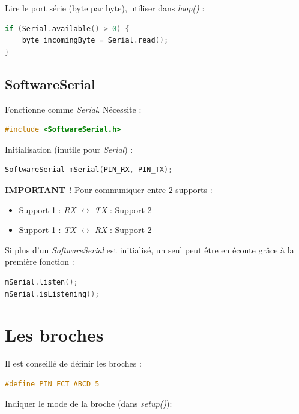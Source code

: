             \bmar
                Lire le port série (byte par byte), utiliser dans \textit{loop()} :
            \emar
            \begin{lstlisting}[language=C]
if (Serial.available() > 0) {
    byte incomingByte = Serial.read();
}
            \end{lstlisting}
        \subsection{SoftwareSerial}
            \bmar
                Fonctionne comme \textit{Serial}. Nécessite :
            \emar
            \begin{lstlisting}[language=C]
#include <SoftwareSerial.h>
            \end{lstlisting}
            \bmar
                Initialisation (inutile pour \textit{Serial}) :
            \emar
            \begin{lstlisting}[language=C]
SoftwareSerial mSerial(PIN_RX, PIN_TX);
            \end{lstlisting}
            \bmar
                \textbf{IMPORTANT !} Pour communiquer entre 2 supports :
            \emar
            \begin{itemize}
                \item Support 1 : \textit{RX} $\leftrightarrow$ \textit{TX} : Support 2
                \item Support 1 : \textit{TX} $\leftrightarrow$ \textit{RX} : Support 2
            \end{itemize}
            \bmar
                Si plus d'un \textit{SoftwareSerial} est initialisé, un seul peut être en écoute grâce à la première fonction :
            \emar
            \begin{lstlisting}[language=C]
mSerial.listen();
mSerial.isListening();
            \end{lstlisting}

    \section{Les broches}
        \bmar
            Il est conseillé de définir les broches :
        \emar
        \begin{lstlisting}[language=C]
#define PIN_FCT_ABCD 5
        \end{lstlisting}

        \bmar
            Indiquer le mode de la broche (dans \textit{setup()}):
        \emar

